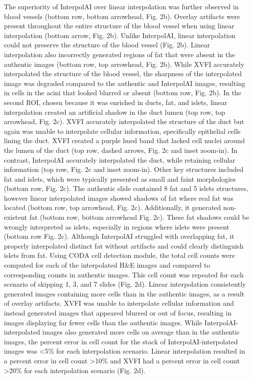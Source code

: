 \begin{refsection}
    The superiority of InterpolAI over linear interpolation was further observed in blood vessels (bottom row, bottom arrowhead, Fig. 2b). Overlay artifacts were present throughout the entire structure of the blood vessel when using linear interpolation (bottom arrow, Fig. 2b). Unlike InterpolAI, linear interpolation could not preserve the structure of the blood vessel (Fig. 2b). Linear interpolation also incorrectly generated regions of fat that were absent in the authentic images (bottom row, top arrowhead, Fig. 2b). While XVFI accurately interpolated the structure of the blood vessel, the sharpness of the interpolated image was degraded compared to the authentic and InterpolAI images, resulting in cells in the acini that looked blurred or absent (bottom row, Fig. 2b). 
    In the second ROI, chosen because it was enriched in ducts, fat, and islets, linear interpolation created an artificial shadow in the duct lumen (top row, top arrowhead, Fig. 2c). XVFI accurately interpolated the structure of the duct but again was unable to interpolate cellular information, specifically epithelial cells lining the duct.  XVFI created a purple hued band that lacked cell nuclei around the lumen of the duct (top row, dashed arrows, Fig. 2c and inset zoom-in).  In contrast, InterpolAI accurately interpolated the duct, while retaining cellular information (top row, Fig. 2c and inset zoom-in). Other key structures included fat and islets, which were typically presented as small and faint morphologies (bottom row, Fig. 2c). The authentic slide contained 8 fat and 5 islets structures, however linear interpolated images showed shadows of fat where real fat was located (bottom row, top arrowhead, Fig. 2c). Additionally, it generated non-existent fat (bottom row, bottom arrowhead Fig. 2c). These fat shadows could be wrongly interpreted as islets, especially in regions where islets were present (bottom row Fig. 2c). Although InterpolAI struggled with overlapping fat, it properly interpolated distinct fat without artifacts and could clearly distinguish islets from fat.
    Using CODA cell detection module, the total cell counts were computed for each of the interpolated H&E images and compared to corresponding counts in authentic images. This cell count was repeated for each scenario of skipping 1, 3, and 7 slides (Fig. 2d). Linear interpolation consistently generated images containing more cells than in the authentic images, as a result of overlay artifacts. XVFI was unable to interpolate cellular information and instead generated images that appeared blurred or out of focus, resulting in images displaying far fewer cells than the authentic images. While InterpolAI-interpolated images also generated more cells on average than in the authentic images, the percent error in cell count for the stack of InterpolAI-interpolated images was <5\% for each interpolation scenario. Linear interpolation resulted in a percent error in cell count >10\% and XVFI had a percent error in cell count >20\% for each interpolation scenario (Fig. 2d). 

\end{refsection}
